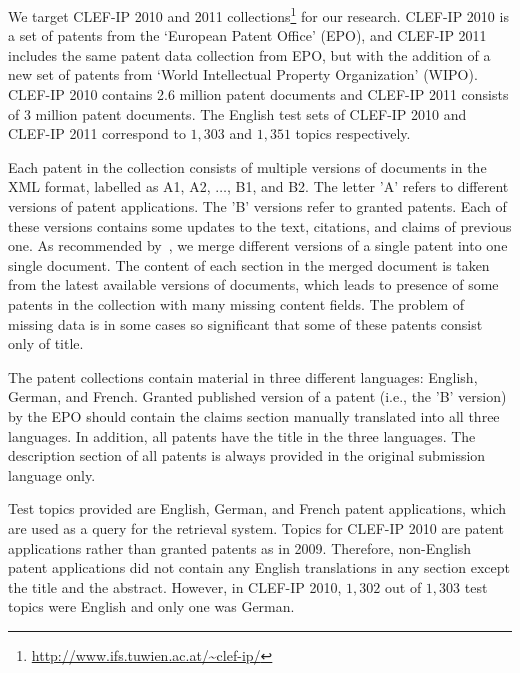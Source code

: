 We target CLEF-IP 2010 and 2011 collections\footnote{\url{http://www.ifs.tuwien.ac.at/~clef-ip/}}
for our research. CLEF-IP 2010 is a set of patents from the `European Patent Office' (EPO), and CLEF-IP 2011 includes the same patent data collection from EPO, but with the addition of a new set of patents from `World Intellectual Property Organization' (WIPO). CLEF-IP 2010 contains 2.6 million patent documents and CLEF-IP 2011 consists of 3 million patent documents. The English test sets of CLEF-IP 2010 and CLEF-IP 2011 correspond to $1,303$ and $1,351$ topics respectively.

Each patent in the collection consists of multiple versions of documents in the XML format, labelled as A1, A2, $\ldots$, B1, and B2. The letter 'A' refers to different versions of patent applications. The 'B' versions refer to granted patents. Each of these versions contains some updates to the text, citations, and claims of previous one. As recommended by~\cite{magdy2012toward}, we merge different versions of a single patent into one single document. The content of each section in the merged document is taken from the latest available versions of documents, which leads to presence of some patents in the collection with many missing content fields. The problem of missing data is in some cases so significant that some of these patents consist only of title.

The patent collections contain material in three different languages: English, German, and French. Granted published version of a patent (i.e., the 'B' version) by the EPO should contain the claims section manually translated into all three languages. In addition, all patents have the title in the three languages. The description section of all patents is always provided in the original submission language only.

Test topics provided are English, German, and French patent applications, which are used as a query for the retrieval system. Topics for CLEF-IP 2010 are patent applications rather than granted patents as in 2009. Therefore, non-English patent applications did not contain any English translations in any section except the title and the abstract. However, in CLEF-IP 2010, $1,302$ out of $1,303$ test topics were English and only one was German. 

